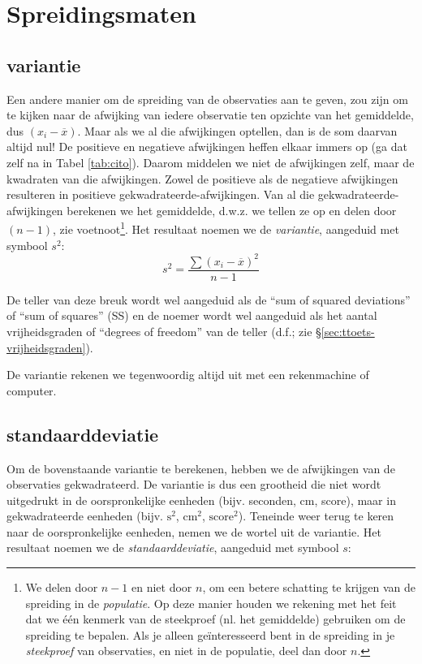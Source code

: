 \documentclass[
]{book}
\begin{document}
\section{Spreidingsmaten}\label{sec:spreidingsmaten}

\subsection{variantie}\label{sec:variantie}

Een andere
manier om de spreiding van de observaties aan te geven, zou zijn om te
kijken naar de afwijking van iedere observatie ten opzichte van het
gemiddelde, dus \((x_i-\overline{x})\). Maar als we al die afwijkingen
optellen, dan is de som daarvan altijd nul! De positieve en negatieve
afwijkingen heffen elkaar immers op (ga dat zelf na in
Tabel \ref{tab:cito}).
Daarom middelen we niet de afwijkingen zelf, maar de kwadraten van die
afwijkingen. Zowel de positieve als de negatieve afwijkingen resulteren
in positieve gekwadrateerde-afwijkingen. Van al die
gekwadrateerde-afwijkingen berekenen we het gemiddelde, d.w.z. we tellen
ze op en delen door \((n-1)\), zie voetnoot\footnote{We delen door \(n-1\) en niet door \(n\), om een betere schatting te krijgen van de spreiding in de \emph{populatie}. Op deze manier houden we rekening met het feit dat we één kenmerk van de steekproef (nl. het gemiddelde) gebruiken om de spreiding te bepalen. Als je alleen geïnteresseerd bent in de spreiding in je \emph{steekproef} van observaties, en niet in de populatie, deel dan door \(n\).}. Het resultaat noemen we
de \emph{variantie}, aangeduid met symbool \(s^2\):
\begin{equation}
  s^2 = \frac{ \sum (x_i - \overline{x})^2 } {n-1}
  \label{eq:variantie}
\end{equation}

De teller van
deze breuk wordt wel aangeduid als de ``sum of squared deviations'' of
``sum of squares'' (SS) en de noemer wordt wel aangeduid als het aantal
vrijheidsgraden of ``degrees of freedom'' van de teller (d.f.; zie
§\ref{sec:ttoets-vrijheidsgraden}).

De variantie rekenen we tegenwoordig altijd uit met een rekenmachine of
computer.

\subsection{standaarddeviatie}\label{sec:standaarddeviatie}

Om de bovenstaande variantie te berekenen, hebben we de afwijkingen van
de observaties gekwadrateerd. De variantie is dus een grootheid die niet
wordt uitgedrukt in de oorspronkelijke eenheden (bijv. seconden, cm,
score), maar in gekwadrateerde eenheden (bijv. \(\textrm{s}^2\),
\(\textrm{cm}^2\), \(\textrm{score}^2\)). Teneinde weer terug te keren naar
de oorspronkelijke eenheden, nemen we de wortel uit de variantie. Het
resultaat noemen we de \emph{standaarddeviatie}, aangeduid met symbool \(s\):
\end{document}
